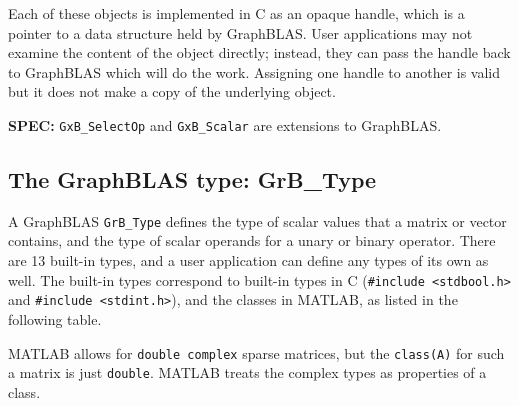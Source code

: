 \documentclass[12pt]{article}
\begin{document}
Each of these objects is implemented in C as an opaque handle, which is a
pointer to a data structure held by GraphBLAS.  User applications may not
examine the content of the object directly; instead, they can pass the handle
back to GraphBLAS which will do the work.  Assigning one handle to another
is valid but it does not make a copy of the underlying object.

\begin{spec}
{\bf SPEC:} \verb'GxB_SelectOp' and \verb'GxB_Scalar' are extensions to
GraphBLAS.
\end{spec}

\newpage
\subsection{The GraphBLAS type: {\sf GrB\_Type}} %
\label{type}

A GraphBLAS \verb'GrB_Type' defines the type of scalar values that a matrix or
vector contains, and the type of scalar operands for a unary or binary
operator.  There are 13 built-in types, and a user application can define
any types of its own as well.  The built-in types correspond to built-in types
in C (\verb'#include <stdbool.h>' and \verb'#include <stdint.h>'), and the
classes in MATLAB, as listed in the following table.

MATLAB allows for \verb'double complex' sparse matrices, but the
\verb'class(A)' for such a matrix is just \verb'double'.  MATLAB treats
the complex types as properties of a class.
\end{document}
